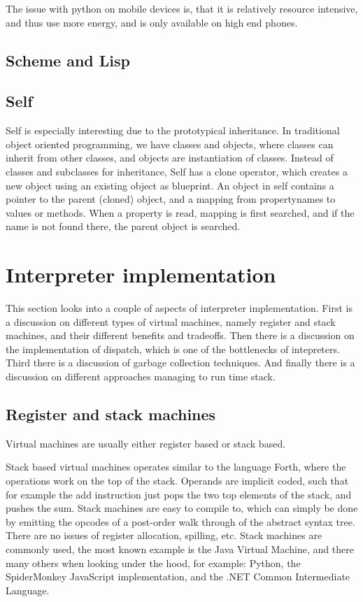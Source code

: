 \documentclass[11pt]{report}
\begin{document}
The issue with python on mobile devices is, that it is relatively resource intensive, and thus use more energy, and is only available on high end phones.

\subsection{Scheme and Lisp}
\subsection{Self}
\label{survey-self}
Self \cite{self} is especially interesting due to the prototypical inheritance.
In traditional object oriented programming, we have classes and objects, where classes can inherit from other classes, and objects are instantiation of classes.
Instead of classes and subclasses for inheritance, Self has a clone operator, which creates a new object using an existing object as blueprint.
An object in self contains a pointer to the parent (cloned) object, and a mapping from propertynames to values or methods. When a property is read, mapping is first searched, and if the name is not found there, the parent object is searched.

\section{Interpreter implementation}
\label{interpreter-implementation}
This section looks into a couple of aspects of interpreter implementation.
First is a discussion on different types of virtual machines, namely register and stack machines, and their different benefits and tradeoffs.
Then there is a discussion on the implementation of dispatch, which is one of the bottlenecks of intepreters.
Third there is a discussion of garbage collection techniques.
And finally there is a discussion on different approaches managing to run time stack.

\subsection{Register and stack machines}
Virtual machines are usually either register based or stack based.

Stack based virtual machines operates similar to the language Forth, where the operations work on the top of the stack. 
Operands are implicit coded, such that for example the add instruction just pops the two top elements of the stack, and pushes the sum. 
Stack machines are easy to compile to, 
which can simply be done by emitting the opcodes of a post-order walk through of the abstract syntax tree. 
There are no issues of register allocation, spilling, etc.
Stack machines are commonly used, the most known example is the Java Virtual Machine, and there many others when looking under the hood, for example: Python, the SpiderMonkey JavaScript implementation, and the .NET Common Intermediate Language.
\end{document}
